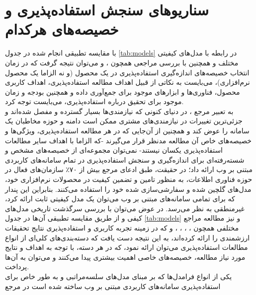 \section{سناریو‌های سنجش استفاده‌پذیری و خصیصه‌های هرکدام}
با مقایسه تطبیقی انجام شده در جدول
\ref{tab:models}
در رابطه با مدل‌های کیفیتی مختلف و همچنین با بررسی مراجعی همچون
\cite{wagner_software_2012}،
\cite{wagner_software_2013} و
\cite{albert_measuring_2013}
می‌توان نتیجه گرفت که در زمان انتخاب خصیصه‌های اندازه‌گیری استفاده‌پذیری در یک محصول (و نه الزاما یک محصول نرم‌افزاری)، می‌بایست به نکاتی از قبیل اهداف مطالعه استفاده‌پذیری، اهداف کاربری محصول، فناوری‌ها و ابزارهای موجود برای جمع‌آوری داده و همچنین بودجه و زمان موجود برای تحقیق درباره استفاده‌پذیری، می‌بایست توجه کرد.\\
به تعبیر مرجع
\cite{albert_measuring_2013}،
در دنیای کنونی که نیازمندی‌ها بسیار گسترده و مفصل شده‌اند و جزئی‌ترین تغییرات در نیازمندی‌های مشتری ممکن است دامنه و حوزه مخاطبان یک سامانه را عوض کند و همچنین از آن‌جایی که در هر مطالعه استفاده‌پذیری، ویژگی‌ها و خصیصه‌های خاص آن مطالعه مدنظر قرار می‌گیرند -که الزاما با اهداف سایر مطالعات استفاده‌پذیری یکسان نیستند- نمی‌توان مجموعه‌ای از خصیصه‌های مشخص و شسته‌رفته‌ای برای اندازه‌گیری و سنجش استفاده‌پذیری در تمام سامانه‌های کاربردی مبتنی بر وب ارائه داد؛‌
در حقیقت، طبق ادعای مرجع
\cite{wagner_software_2012}
بیش از ۷۰٪ سازمان‌های فعال در حوزه فناوری اطلاعات، به منظور تامین و تضمین کیفیت در محصولات نرم‌افزاری خود، مدل‌های گلچین شده و سفارشی‌سازی شده خود را استفاده می‌کنند. بنابراین این پندار که برای تمامی سامانه‌های مبتنی بر وب می‌توان یک مدل کیفیتی ثابت ارائه کرد، غیرمنطقی به نظر می‌رسد. در عوض می‌توان با بررسی سرگذشت تاریخی مدل‌های کیفی و از طریق مقایسه تطبیقی آن‌ها در جدول
\ref{tab:models}
و نیز مطالعه مراجع مختلفی همچون
\cite{alonso-rios_usability:_2009}،
\cite{bass_linking_2003}،
\cite{bevan_what_1991}،
\cite{pressman_software_2015}،
\cite{sommerville_software_2016}
و
\cite{albert_measuring_2013}
که در زمینه تجربه کاربری و استفاده‌پذیری نتایج تحقیقات ارزشمندی را ارائه کرده‌اند، به این نتیجه دست یافت که دسته‌بندی‌های کلی‌ای از انواع مطالعات استفاده‌پذیری می‌توان ارائه نمود، که در هر دسته، با توجه به اهداف و نتایج مورد نیاز مطالعه، خصیصه‌های خاصی اهمیت بیشتری پیدا می‌کنند و می‌توان به آن‌ها پرداخت.\\
یکی از انواع فرامدل‌ها که بر مبنای مدل‌های سلسه‌مراتبی و به طور خاص برای استفاده‌پذیری سامانه‌های کاربردی مبتنی بر وب ساخته شده است در مرجع
